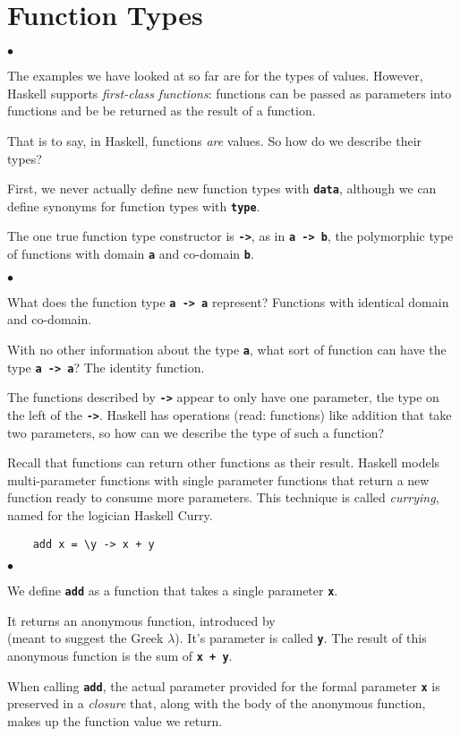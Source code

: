 \documentclass[12pt]{article}
\newcommand\code[1]{\texttt{\textbf{#1}}}
\newenvironment{notelist}{\begin{list}
   {$\bullet$}
   {\setlength{\itemsep}{0in}}}
   {\end{list}}
\begin{document}
\section{Function Types}

\begin{notelist}
    \item The examples we have looked at so far are for the types of values. However, Haskell supports
          \textit{first-class functions}: functions can be passed as parameters into functions and be
          be returned as the result of a function.
    \item That is to say, in Haskell, functions \textit{are} values. So how do we describe their types?
    \item First, we never actually define new function types with \code{data}, although we can define
          synonyms for function types with \code{type}.
    \item The one true function type constructor is \code{->}, as in \code{a -> b}, the polymorphic
          type of functions with domain \code{a} and co-domain \code{b}.
    \begin{notelist}
        \item What does the function type \code{a -> a} represent? Functions with identical domain and co-domain.
        \item With no other information about the type \code{a}, what sort of function can have
              the type \code{a -> a}? The identity function.
    \end{notelist}
    \item The functions described by \code{->} appear to only have one parameter, the type on the 
          left of the \code{->}. Haskell has operations (read: functions) like addition that take two parameters,
          so how can we describe the type of such a function?
    \item Recall that functions can return other functions as their result. Haskell models multi-parameter
          functions with single parameter functions that return a new function ready to consume more parameters.
          This technique is called \textit{currying}, named for the logician Haskell Curry.
    \begin{lstlisting} 
    add x = \y -> x + y
    \end{lstlisting} 
    \begin{notelist}
        \item We define \code{add} as a function that takes a single parameter \code{x}.
        \item It returns an anonymous function, introduced by \code{\\} (meant to suggest the Greek $\lambda$).
              It's parameter is called \code{y}. The result of this anonymous function is the sum of \code{x + y}. 
        \item When calling \code{add}, the actual parameter provided for the formal parameter \code{x} is preserved
              in a \textit{closure} that, along with the body of the anonymous function, makes up the
              function value we return.
    \end{notelist}
    

\end{notelist}
\end{document}
